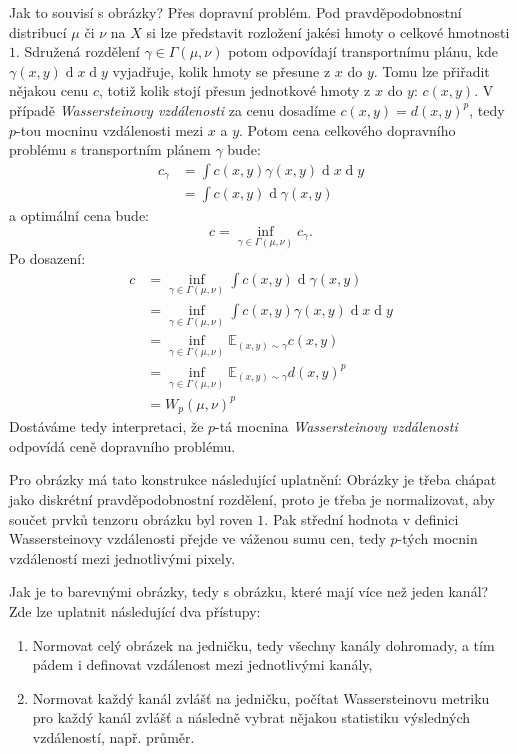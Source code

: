 \documentclass[czech]{article}
\begin{document}
Jak to souvisí s obrázky?
Přes dopravní problém.
Pod pravděpodobnostní distribucí $\mu$ či $\nu$ na $X$ si lze představit rozložení jakési hmoty
o celkové hmotnosti $1$.
Sdružená rozdělení $\gamma \in \Gamma(\mu, \nu)$ potom odpovídají transportnímu plánu,
kde $\gamma(x, y) \operatorname{d}x \operatorname{d}y$
vyjadřuje, kolik hmoty se přesune z $x$ do $y$.
Tomu lze přiřadit nějakou cenu $c$,
totiž kolik stojí přesun jednotkové hmoty z $x$ do $y$: $c(x, y)$.
V případě \emph{Wassersteinovy vzdálenosti}
za cenu dosadíme $c(x, y) = d(x, y)^p$,
tedy $p$-tou mocninu vzdálenosti mezi $x$ a $y$.
Potom cena celkového dopravního problému s transportním plánem $\gamma$ bude:
\begin{align}
    c_\gamma &= \int c(x, y) \gamma(x, y) \operatorname{d}x \operatorname{d}y \\
    &= \int c(x, y) \operatorname{d} \gamma(x, y)
\end{align}
a optimální cena bude:
\begin{equation}
    c = \inf_{\gamma \in \Gamma(\mu, \nu)} c_\gamma.
\end{equation}
Po dosazení:
\begin{align}
    c &= \inf_{\gamma \in \Gamma(\mu, \nu)} \int c(x, y) \operatorname{d} \gamma(x, y) \\
    &= \inf_{\gamma \in \Gamma(\mu, \nu)} \int c(x, y) \gamma(x, y) \operatorname{d}x \operatorname{d}y \\
    &= \inf_{\gamma \in \Gamma(\mu, \nu)} \mathbb{E}_{(x, y) \sim \gamma} c(x, y) \\
    &= \inf_{\gamma \in \Gamma(\mu, \nu)} \mathbb{E}_{(x, y) \sim \gamma} d(x, y)^p \\
    &= W_p (\mu, \nu)^p
\end{align}
Dostáváme tedy interpretaci, že $p$-tá mocnina \emph{Wassersteinovy vzdálenosti}
odpovídá ceně dopravního problému.

Pro obrázky má tato konstrukce následující uplatnění:
Obrázky je třeba chápat jako diskrétní pravděpodobnostní rozdělení,
proto je třeba je normalizovat,
aby součet prvků tenzoru obrázku byl roven $1$.
Pak střední hodnota v definici Wassersteinovy vzdálenosti přejde ve váženou sumu cen,
tedy $p$-tých mocnin vzdáleností mezi jednotlivými pixely.

Jak je to barevnými obrázky, tedy s obrázku, které mají více než jeden kanál?
Zde lze uplatnit následující dva přístupy:
\begin{enumerate}
    \item Normovat celý obrázek na jedničku, tedy všechny kanály dohromady, a tím pádem i definovat vzdálenost mezi jednotlivými kanály,
    \item Normovat každý kanál zvlášť na jedničku, počítat Wassersteinovu metriku pro každý kanál zvlášť
    a následně vybrat nějakou statistiku výsledných vzdáleností, např. průměr.
\end{enumerate}
\end{document}
